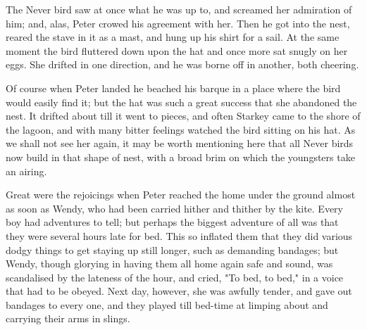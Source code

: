 The Never bird saw at once what he was up to, and screamed her admiration of him;
and, alas, Peter crowed his agreement with her.
Then he got into the nest, reared the stave in it as a mast, and hung up his shirt for a sail.
At the same moment the bird fluttered down upon the hat and once more sat snugly on her eggs.
She drifted in one direction, and he was borne off in another, both cheering.

Of course when Peter landed he beached his barque in a place where the bird would easily find it;
but the hat was such a great success that she abandoned the nest.
It drifted about till it went to pieces, and often Starkey came to the shore of the lagoon, and with many bitter feelings watched the bird sitting on his hat.
As we shall not see her again, it may be worth mentioning here that all Never birds now build in that shape of nest, with a broad brim on which the youngsters take an airing.

Great were the rejoicings when Peter reached the home under the ground almost as soon as Wendy, who had been carried hither and thither by the kite.
Every boy had adventures to tell;
but perhaps the biggest adventure of all was that they were several hours late for bed.
This so inflated them that they did various dodgy things to get staying up still longer, such as demanding bandages;
but Wendy, though glorying in having them all home again safe and sound, was scandalised by the lateness of the hour, and cried, "To bed, to bed," in a voice that had to be obeyed.
Next day, however, she was awfully tender, and gave out bandages to every one, and they played till bed-time at limping about and carrying their arms in slings.

